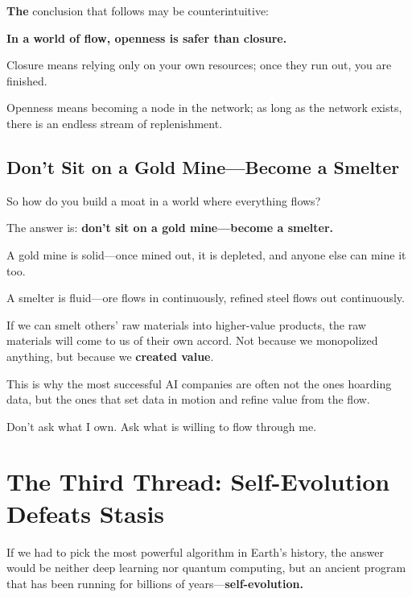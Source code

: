 \vspace{1em}

\newpage
\textbf{The} conclusion that follows may be counterintuitive:

\textbf{In a world of flow, openness is safer than closure.}

Closure means relying only on your own resources; once they run out, you are finished.

Openness means becoming a node in the network; as long as the network exists, there is an endless stream of replenishment.

\subsection{Don't Sit on a Gold Mine---Become a Smelter}

So how do you build a moat in a world where everything flows?

The answer is: \textbf{don't sit on a gold mine---become a smelter.}

A gold mine is solid---once mined out, it is depleted, and anyone else can mine it too.

A smelter is fluid---ore flows in continuously, refined steel flows out continuously.

\vspace{1em}

If we can smelt others' raw materials into higher-value products, the raw materials will come to us of their own accord. Not because we monopolized anything, but because we \textbf{created value}.

\vspace{1em}

This is why the most successful AI companies are often not the ones hoarding data, but the ones that set data in motion and refine value from the flow.

\begin{importantbox}
Don't ask what I own. Ask what is willing to flow through me.
\end{importantbox}

\newpage
\section{The Third Thread: Self-Evolution Defeats Stasis}

If we had to pick the most powerful algorithm in Earth's history, the answer would be neither deep learning nor quantum computing, but an ancient program that has been running for billions of years---\textbf{self-evolution.}

